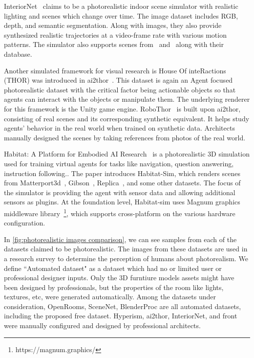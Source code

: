 InteriorNet~\cite{InteriorNet18} claims to be a photorealistic indoor scene simulator with realistic lighting and scenes which change over time.
The image dataset includes RGB, depth, and semantic segmentation.
Along with images, they also provide synthesized realistic trajectories at a video-frame rate with various motion patterns.
The simulator also supports scenes from~\cite{McCormac2017} and~\cite{Song2017SemanticSC} along with their database.

Another simulated framework for visual research is House Of inteRactions (THOR) was introduced in \gls{ai2thor}~\cite{ai2thor}.
This dataset is again an Agent focused photorealistic dataset with the critical factor being actionable objects so that agents can interact with the objects or manipulate them.
The underlying renderer for this framework is the Unity game engine.
RoboThor~\cite{robothor} is built upon \gls{ai2thor}, consisting of real scenes and its corresponding synthetic equivalent.
It helps study agents' behavior in the real world when trained on synthetic data.
Architects manually designed the scenes by taking references from photos of the real world.

Habitat: A Platform for Embodied AI Research~\cite{Savva2019} is a photorealistic 3D simulation used for training virtual agents for tasks like navigation, question answering, instruction following..
The paper introduces Habitat-Sim, which renders scenes from Matterport3d~\cite{Chang2018}, Gibson~\cite{Xia2018}, Replica~\cite{Straub2019TheRD}, and some other datasets.
The focus of the simulator is providing the agent with sensor data and allowing additional sensors as plugins.
At the foundation level, Habitat-sim uses Magnum graphics
middleware library~\footnote{https://magnum.graphics/}, which supports cross-platform on the various hardware configuration.

In \autoref{fig:photorealistic images comparison}, we can see samples from each of the datasets claimed to be photorealistic.
The images from these datasets are used in a research survey to determine the perception of humans about photorealism.
We define ``Automated dataset" as a dataset which had no or limited user or professional designer inputs.
Only the 3D furntiure models assets might have been designed by professionals, but the properties of the room like lights, textures, etc, were generated automatically.
Among the datasets under consideration,
OpenRooms, SceneNet, BlenderProc are all automated datasets, including the proposed \gls{free} dataset.
Hyperism, \gls{ai2thor}, InteriorNet, and \gls{front} were manually configured and designed by professional architects.



